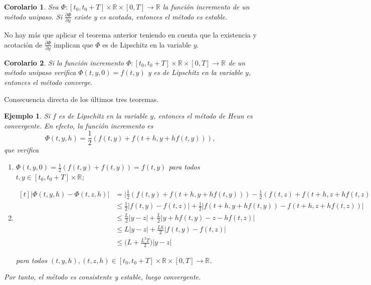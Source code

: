 \documentclass[11pt]{report}
\makeatletter
\renewenvironment{proof}[1][\proofname]{\par
  \pushQED{\qed}%
  \normalfont \topsep\z@skip %
  \trivlist
  \item[\hskip\labelsep
        \itshape
    #1\@addpunct{.}]\ignorespaces
}{%
  \popQED\endtrivlist\@endpefalse
}
\theoremstyle{mytheorem}
\newtheorem{corollary}{Corolario} %
\theoremstyle{mydefinition}
\theoremstyle{myexample}
\newtheorem*{example}{Ejemplo}
\let\oldproofname=\proofname
\renewcommand{\proofname}{\rm\bf{\oldproofname}}}
\newenvironment{ccorollary} %
  {\begin{mdframed}[
        linewidth=3pt,
        linecolor=c2,
        bottomline=false,
        topline=false,
        rightline=false,
        innerrightmargin=0pt,
        innertopmargin=0pt,
        innerbottommargin=0pt,
        innerleftmargin=1em, %
        skipabove=\baselineskip]
    \begin{corollary}}
  {\end{corollary}\end{mdframed}}
\newcommand{\R}{\mathbb R}
\makeatother
\begin{document}
\begin{ccorollary}
Sea $\Phi \colon [t_0,t_0+T] \times \R \times [0,T] \to \R$ la función incremento de un método unipaso. Si $\frac{\partial\Phi}{\partial y}$ existe y es acotada, entonces el método es estable.
\end{ccorollary}

\begin{proof}
    No hay más que aplicar el teorema anterior teniendo en cuenta que la existencia y acotación de $\frac{\partial \Phi}{\partial y}$ implican que $\Phi$ es de Lipschitz en la variable $y$.
\end{proof}

\begin{ccorollary}
Si la función incremento $\Phi \colon [t_0,t_0+T] \times \R \times [0,T] \to \R$ de un método unipaso verifica $\Phi(t,y,0) = f(t,y)$ y es de Lipschitz en la variable $y$, entonces el método converge.
\end{ccorollary}

\begin{proof}
Consecuencia directa de los últimos tres teoremas.
\end{proof}

\begin{example} Si $f$ es de Lipschitz en la variable $y$, entonces el método de Heun es convergente. En efecto, la función incremento es
\[\Phi(t,y,h) = \frac{1}{2}(f(t,y)+f(t+h,y+hf(t,y))),\]
que verifica
\begin{enumerate}
    \item $\displaystyle\Phi(t,y,0) =\frac{1}{2}(f(t,y)+f(t,y))= f(t,y)$ para todos $t,y \in [t_0,t_0+T] \times \R$;
    \item $\displaystyle\begin{aligned}[t]
        |\Phi(t,y,h)-\Phi(t,z,h)| &= \bigl|\frac{1}{2}(f(t,y)+f(t+h,y+hf(t,y)))-\frac{1}{2}(f(t,z)+f(t+h,z+hf(t,z)))\bigr| \\ 
        &\leq \frac{1}{2}\bigl|f(t,y)-f(t,z)\bigr|+\frac{1}{2}\bigl|f(t+h,y+hf(t,y))-f(t+h,z+hf(t,z))\bigr| \\
        &\leq \frac{L}{2}|y-z|+\frac{L}{2}\bigl|y+hf(t,y)-z-hf(t,z)\bigr| \\ 
        &\leq L|y-z|+\frac{Lh}{2}|f(t,y)-f(t,z)| \\
        &\leq \bigl(L+\frac{L^2T}{2}\bigr)|y-z|
    \end{aligned}$
    
    para todos $(t,y,h),(t,z,h)\in [t_0,t_0+T] \times \R \times [0,T] \to \R$.
\end{enumerate}
Por tanto, el método es consistente y estable, luego convergente.
\end{example}
\end{document}
